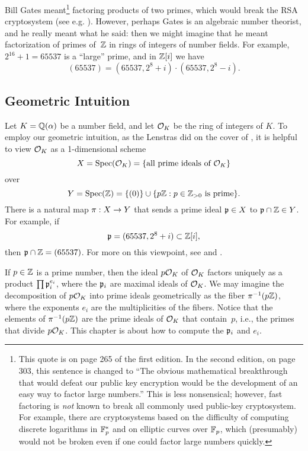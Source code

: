 Bill Gates meant\footnote{This quote is on page 265 of the first
  edition.  In the second edition, on page 303, this sentence is
  changed to ``The obvious mathematical breakthrough that would defeat
  our public key encryption would be the development of an easy way to
  factor large numbers.''  This is less nonsensical; however, fast
  factoring is {\em not} known to break all commonly used public-key
  cryptosystem.  For example, there are cryptosystems based on the
  difficulty of computing discrete logarithms in $\mathbb{F}_p^*$ and on
  elliptic curves over $\mathbb{F}_p$, which (presumably) would not be broken
  even if one could factor large numbers quickly.}  factoring products
of two primes, which would break the RSA cryptosystem (see
e.g. \cite[\S3.2]{stein:ent}).  However, perhaps Gates is an
algebraic number theorist, and he really meant what he said: then we
might imagine that he meant factorization of primes of~$\mathbb{Z}$ in rings
of integers of number fields.  For example, $2^{16}+1 = 65537$ is a
``large'' prime, and in $\mathbb{Z}[i]$ we have
$$
	(65537) = (65537, 2^8 + i) \cdot (65537, 2^8 - i).
$$

\subsection{Geometric Intuition}\label{sec:geom_intuition}

Let $K=\mathbb{Q}(\alpha)$ be a number field, and let $\mathcal{O}_K$ be the ring of integers
of $K$. To employ our geometric intuition, as the Lenstras did on the cover
of \cite{lenstras:nfs}, it is helpful to view $\mathcal{O}_K$ as a 1-dimensional scheme
$$
	X = \operatorname{Spec}(\mathcal{O}_K) = \{\text{all prime ideals of $\mathcal{O}_K$}\}
$$
over
$$
	Y=\operatorname{Spec}(\mathbb{Z}) = \{ (0) \} \cup \{ p\mathbb{Z} : p \in\mathbb{Z}_{>0} \text{ is prime}\}.
$$
There is a natural map $\pi :X\rightarrow Y$ that sends a prime ideal $\mathfrak{p}\in X$ to
$\mathfrak{p} \cap \mathbb{Z}\in Y$. For example, if
$$
	\mathfrak{p} = (65537, 2^8 + i)\subset\mathbb{Z}[i],
$$
then $\mathfrak{p} \cap \mathbb{Z} = (65537)$. For more on this viewpoint,
see \cite{hartshorne} and \cite[Ch.~2]{eisenbud_harris:geometry}.

If $p\in\mathbb{Z}$ is a prime number, then the ideal $p\mathcal{O}_K$ of $\mathcal{O}_K$
factors uniquely as a product $\prod \mathfrak{p}_i^{e_i}$, where the $\mathfrak{p}_i$ are
maximal ideals of $\mathcal{O}_K$.  We may imagine the decomposition of $p\mathcal{O}_K$
into prime ideals geometrically as the fiber $\pi^{-1}(p\mathbb{Z})$, where
the exponents $e_i$ are the multiplicities of the fibers.  Notice that
the elements of $\pi^{-1}(p\mathbb{Z})$ are the prime ideals of $\mathcal{O}_K$ that
contain~$p$, i.e., the primes that divide $p\mathcal{O}_K$.
This chapter is about how to compute the $\mathfrak{p}_i$ and $e_i$.

